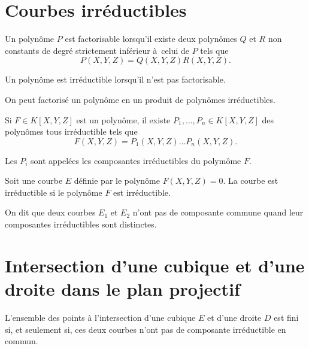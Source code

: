 \section{Courbes irréductibles}

\begin{definition}
    \label{def:polyIrr}
    Un polynôme $P$ est factorisable lorsqu'il existe deux polynômes $Q$ et $R$ non
    constants de degré strictement inférieur à celui de $P$ tels que
    \[
    P(X,Y,Z) = Q(X,Y,Z)R(X,Y,Z)
    .\] 

    Un polynôme est irréductible lorsqu'il n'est pas factorisable.

    On peut factorisé un polynôme en un produit de polynômes irréductibles. 

    Si $F
    \in K[X,Y,Z]$ est un polynôme, il existe $P_1,\ldots,P_{n} \in K[X,Y,Z]$ des polynômes
    tous
    irréductible tels que
    \[
    F(X,Y,Z)= P_1(X,Y,Z)\ldots P_{n}(X,Y,Z)
    .\] 

    Les $P_{i}$ sont appelées les composantes irréductibles du polymôme $F$.
\end{definition}

\begin{definition}
    \label{def:courbeIrr}
    
    Soit une courbe $E$ définie par le polynôme $F(X,Y,Z) = 0$. La courbe est irréductible si
    le polynôme $F$ est irréductible.
\end{definition}

On dit que deux courbes $E_1$ et $E_2$ n'ont pas de composante commune quand leur
composantes irréductibles sont distinctes.

\section{Intersection d'une cubique et d'une droite dans le plan projectif}

\begin{proposition}
    \label{prop:intersectionED}
    
    L'ensemble des points à l'intersection d'une cubique $E$ et d'une droite $D$ est fini si, et
    seulement si, ces deux courbes n'ont pas de composante irréductible en commun.
\end{proposition}

